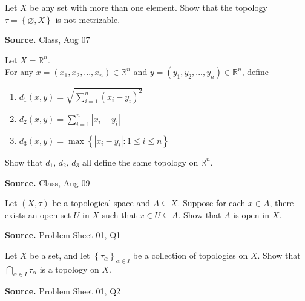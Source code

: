 \documentclass[12pt,twoside]{report}
\newenvironment*{source}{\hfill\scriptsize\textbf{Source.}\space}{\par}
\begin{document}
\begin{samepage}
\begin{ex}
Let $X$ be any set with more than one element. 
Show that the topology $\tau = \left\{ \varnothing, X \right\}$ is not metrizable.
\end{ex}
\begin{source}
Class, Aug 07
\end{source}
\end{samepage}

\begin{samepage}
\begin{ex}
Let $X = \mathbb{R} ^n$. \\
For any $x = \left (x_1, x_2, ..., x_n\right ) \in \mathbb{R} ^n$ and 
$y = \left (y_1, y_2, ..., y_n\right ) \in \mathbb{R} ^n$, define 
\begin{enumerate}
    \item $ d_1 \left (x,y\right ) = \sqrt { \sum_{i = 1}^n \left (x_i - y_i\right ) ^2 } $
    \item $ d_2 \left (x,y\right ) = \sum_{i = 1}^n |x_i - y_i| $
    \item $ d_3 \left (x,y\right ) = \displaystyle\max \left\{ | x_i - y_i |  :  1 \leq i \leq n \right\} $
\end{enumerate}
Show that $d_1$, $d_2$, $d_3$ all define the same topology on $\mathbb{R} ^n$.
\end{ex}
\begin{source}
Class, Aug 09
\end{source}
\end{samepage}

\begin{samepage}
\begin{ex}
Let $\left (X, \tau\right )$ be a topological space and $A \subseteq X$.
Suppose for each $x \in A$, there exists an open set $U$ in $X$ such that $x \in U \subseteq A$. Show that $A$ is open in $X$.
\end{ex}
\begin{source}
Problem Sheet 01, Q1
\end{source}
\end{samepage}

\begin{samepage}
\begin{ex}
Let $X$ be a set, and let $ \left\{ \tau_\alpha \right\}_{ \alpha \in I } $ be a collection of topologies on $X$. 
Show that $ \displaystyle\bigcap_{\alpha \in I} \tau_\alpha $ is a topology on $X$.
\end{ex}
\begin{source}
Problem Sheet 01, Q2
\end{source}
\end{samepage}
\end{document}
